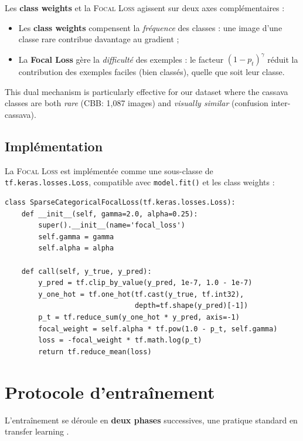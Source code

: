 \documentclass[12pt, a4paper, twoside]{report}
\newcommand{\focal}{\textsc{Focal Loss}}
\begin{document}
Les \textbf{class weights} et la \focal{} agissent sur deux axes complémentaires :
\begin{itemize}
    \item Les \textbf{class weights} compensent la \textit{fréquence} des classes : une image d'une classe rare contribue davantage au gradient ;
    \item La \textbf{Focal Loss} gère la \textit{difficulté} des exemples : le facteur $(1 - p_t)^\gamma$ réduit la contribution des exemples faciles (bien classés), quelle que soit leur classe.
\end{itemize}

This dual mechanism is particularly effective for our dataset where the cassava classes are both \textit{rare} (CBB: 1,087 images) and \textit{visually similar} (confusion inter-cassava).

\subsection{Implémentation}

La \focal{} est implémentée comme une sous-classe de \texttt{tf.keras.losses.Loss}, compatible avec \texttt{model.fit()} et les class weights :

\begin{lstlisting}[caption={Implémentation de la Focal Loss (extrait simplifié).}, label={lst:focal}]
class SparseCategoricalFocalLoss(tf.keras.losses.Loss):
    def __init__(self, gamma=2.0, alpha=0.25):
        super().__init__(name='focal_loss')
        self.gamma = gamma
        self.alpha = alpha

    def call(self, y_true, y_pred):
        y_pred = tf.clip_by_value(y_pred, 1e-7, 1.0 - 1e-7)
        y_one_hot = tf.one_hot(tf.cast(y_true, tf.int32),
                               depth=tf.shape(y_pred)[-1])
        p_t = tf.reduce_sum(y_one_hot * y_pred, axis=-1)
        focal_weight = self.alpha * tf.pow(1.0 - p_t, self.gamma)
        loss = -focal_weight * tf.math.log(p_t)
        return tf.reduce_mean(loss)
\end{lstlisting}

\section{Protocole d'entraînement}

L'entraînement se déroule en \textbf{deux phases} successives, une pratique standard en transfer learning \cite{yosinski2014transferable}.
\end{document}
